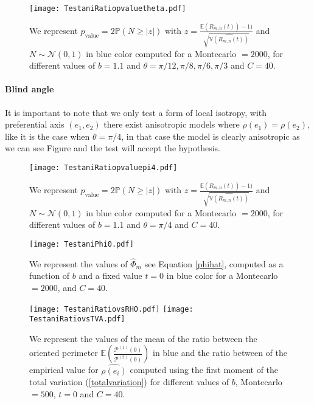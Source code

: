 \documentclass[12pt]{article}
\renewcommand{\hat}{\widehat}
\theoremstyle{Theorem}
\theoremstyle{definition}
\begin{document}
\begin{figure}[H]
  \centering
    {\texttt{[image: TestaniRatiopvaluetheta.pdf]}}
    \hspace{0.2cm} 
 \caption{We represent $p_{\text{value}} = 2\mathbb{P}\left(N \geq |z|\right)$ with $z = \frac{\mathbb{E}\left(R_{m,n}(t)\right) - 1)}{\sqrt{\hat{\mathbb{V}\left(R_{m, n}(t)\right)}}}$ and $N \sim \mathcal{N}(0,1)$ in blue color computed for a Montecarlo $= 2000$, for different values of $b = 1.1$ and $\theta = \pi/12, \pi/8, \pi/6, \pi/3$ and $C = 40$.}
\label{fig2}
\end{figure}

\paragraph{Blind angle}It is important to note that we only test a form of local isotropy, with preferential axis $(e_1,e_2)$ there exist anisotropic models where $\rho(e_1) = \rho(e_2)$, like it is the case when $\theta = \pi/4$, in that case the model is clearly anisotropic as we can see Figure and the test will accept the hypothesis. 
\begin{figure}[H]
  \centering
    {\texttt{[image: TestaniRatiopvaluepi4.pdf]}}
    \hspace{0.2cm} 
 \caption{We represent $p_{\text{value}} = 2\mathbb{P}\left(N \geq |z|\right)$ with $z = \frac{\mathbb{E}\left(R_{m,n}(t)\right) - 1)}{\sqrt{\hat{\mathbb{V}\left(R_{m, n}(t)\right)}}}$ and $N \sim \mathcal{N}(0,1)$ in blue color computed for a Montecarlo $= 2000$, for different values of $b = 1.1$ and $\theta = \pi/4$ and $C = 40$.}
\label{fig2}
\end{figure}
\begin{figure}[H]
  \centering
    {\texttt{[image: TestaniPhi0.pdf]}}
    \hspace{0.2cm} 
 \caption{We represent the values of $\hat{\Phi}_{m}$ see Equation \eqref{phihat}, computed as a function of $b$ and a fixed value $t=0$ in blue color for a Montecarlo $= 2000$, and $C = 40$.}
\label{fig2}
\end{figure}

\begin{figure}[H]
  \centering
    {\texttt{[image: TestaniRatiovsRHO.pdf]}}
    {\texttt{[image: TestaniRatiovsTVA.pdf]}}
    \hspace{0.2cm} 
 \caption{We represent the values of the mean of the ratio between the oriented perimeter $\mathbb{E}\left(\frac{\mathcal{P}^{(1)}(0)}{\mathcal{P}^{(2)}(0)}\right)$ in blue and the ratio between of the empirical value for $\hat{\rho(e_i)}$ computed using the first moment of the total variation (\ref{totalvariation}) for different values of $b$, Montecarlo $= 500$, $t = 0$ and $C = 40$.}
\label{fig2}
\end{figure}
\end{document}
